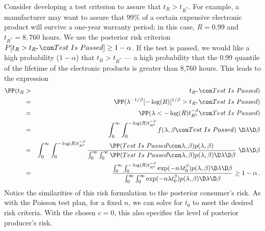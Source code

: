 \documentclass {book}
\begin{document}
Consider developing a test criterion to assure that $t_{R} >
t_{R^*}$. For example, a manufacturer may want to assure that
$99\%$ of a certain expensive electronic product will survive a
one-year warranty period; in this case, $R = 0.99$ and $t_{R^*} =
8,760$ hours. We use the posterior risk criterion $P[t_{R} >
t_{R^*} \con Test\mbox{ }Is\mbox{ }Passed] \geq 1 - \alpha$. If
the test is passed, we would like a high probability ($1 -
\alpha$) that $t_{R} > t_{R^*}$ --- a high probability that the
0.99 quantile of the lifetime of the electronic products is
greater than 8,760 hours. This leads to the expression
\begin{eqnarray}\label{ch10:wtc}
\PP(t_{R} & > & t_{R^*} \con Test\mbox{ } Is\mbox{ }Passed)\\
\mbox{} & = & \PP(
\lambda^{-1/\beta}[-\log(R)]^{1/\beta} > t_{R^*} \con Test\mbox{ } Is\mbox{ }Passed)\nonumber\\
\mbox{} & = & \PP(\lambda < -\log(R)t_{R^*}^{-\beta} \con
Test\mbox{ } Is\mbox{ }Passed)\nonumber\\
\mbox{} & = & \int_0^{\infty} \int_{0}^{-\log(R)t_{R^*}^{-\beta}}
f(\lambda,\beta \con Test\mbox{ } Is\mbox{
}Passed) \,\, \D \lambda \D \beta\nonumber\\
\mbox{} & = & \int_0^{\infty} \int_{0}^{-\log(R)t_{R^*}^{-\beta}}
\frac{\PP(Test\mbox{ }Is\mbox{ }Passed \con \lambda,
\beta)p(\lambda, \beta)}{\int_{0}^{\infty} \int_{0}^{\infty}
\PP(Test\mbox{
}Is\mbox{ }Passed \con \lambda, \beta)p(\lambda, \beta) \D\lambda \D \beta} \,\, \D \lambda \D \beta\nonumber\\
& = & \frac{\int_0^\infty \int^{-\log(R)t_{R^*}^{-\beta}}_0
\exp(-n\lambda t_0^{\beta}) p(\lambda, \beta) \D \lambda \D
\beta}{\int_0^\infty \int_0^\infty \exp(-n\lambda t_0^{\beta})
p(\lambda, \beta) \D \lambda \D \beta} \geq 1 - \alpha \, .
\nonumber
\end{eqnarray}
Notice the similarities of this risk formulation to the posterior
consumer's risk. As with the Poisson test plan, for a fixed $n$,
we can solve for $t_0$ to meet the desired risk criteria.
With the chosen $c = 0$, this also specifies the level of posterior
producer's risk.
\end{document}
